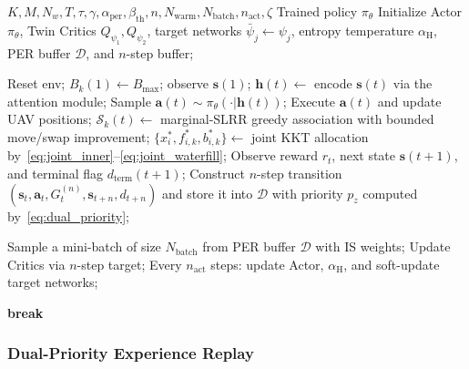 \documentclass[journal]{IEEEtran}
\begin{document}
\begin{algorithm}[t]
\caption{DARS Training Procedure}
\label{alg:dars}
\begin{algorithmic}[1]
\REQUIRE $K, M, N_w, T, \tau, \gamma, \alpha_{\mathrm{per}},
   \beta_{\mathrm{th}},
  n, N_{\mathrm{warm}}, N_{\mathrm{batch}}, n_{\mathrm{act}}, \zeta$
\ENSURE Trained policy $\pi_\theta$
\STATE Initialize Actor $\pi_\theta$, Twin Critics $Q_{\psi_1}, Q_{\psi_2}$,
  target networks $\bar\psi_j\!\leftarrow\!\psi_j$, entropy temperature
  $\alpha_{\mathrm{H}}$, PER buffer $\mathcal{D}$, and $n$-step buffer;

  \STATE Reset env; $B_k(1) \leftarrow B_{\max}$; observe $\bm{s}(1)$;
    \STATE $\bm{h}(t) \leftarrow$ encode $\bm{s}(t)$
      via the attention module;
    \STATE Sample $\bm{a}(t) \sim
      \pi_\theta(\cdot|\bm{h}(t))$;
    \STATE Execute $\bm{a}(t)$ and update UAV positions;
    \STATE $\mathcal{S}_k(t) \leftarrow$ marginal-SLRR greedy association with bounded move/swap improvement;
    \STATE $\{x_i^*,f_{i,k}^*,b_{i,k}^*\} \leftarrow$
      joint KKT allocation by~\eqref{eq:joint_inner}--\eqref{eq:joint_waterfill};
    \STATE Observe reward $r_t$, next state $\bm{s}(t+1)$, and terminal flag $d_{\mathrm{term}}(t+1)$;
    \STATE Construct $n$-step transition $(\bm{s}_t, \bm{a}_t, G_t^{(n)},
      \bm{s}_{t+n}, d_{t+n})$ and store it into $\mathcal{D}$ with priority
      $p_z$ computed by~\eqref{eq:dual_priority};



      \STATE Sample a mini-batch of size \(N_{\mathrm{batch}}\) from PER buffer $\mathcal{D}$ with IS weights;
      \STATE Update Critics via $n$-step target;
      \STATE Every $n_{\mathrm{act}}$ steps: update Actor, $\alpha_{\mathrm{H}}$, and soft-update target networks;
    \ENDIF


      \STATE \textbf{break}
    \ENDIF

  \ENDFOR
\ENDFOR
\end{algorithmic}
\end{algorithm}

\subsubsection{Dual-Priority Experience Replay}\label{subsubsec:dual_per}
\end{document}
